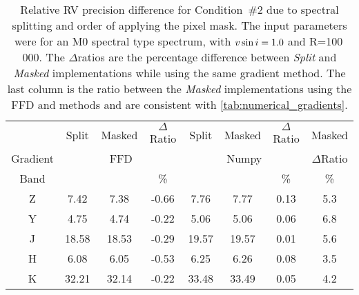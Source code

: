 
\begin{table}
    \centering
    \caption[{RV} precision with different splitting.]{Relative {RV} precision difference for Condition~\#2 due to spectral splitting and order of applying the pixel mask.
        The input parameters were for an {M0} spectral type spectrum, with $v\sin{i}=1.0$ and R=100\,000.
        The \(\Delta\)ratios are the percentage difference between \textit{Split} and \textit{Masked} implementations while using the same gradient method.
        The last column is the ratio between the \textit{Masked} implementations using the {FFD} and \npgradient{} methods and are consistent with \cref{tab:numerical_gradients}.
        }
    \begin{tabular}{c|ccc|ccc|c}
        \toprule
        & Split & Masked & \(\Delta\)Ratio & Split & Masked & \(\Delta\)Ratio & Masked \\
        Gradient & \multicolumn{3}{c|}{FFD} & \multicolumn{3}{c|}{Numpy} & \(\Delta\)Ratio\\
        Band & \mps{} & \mps{} &  \%  & \mps{} & \mps{} &   \% & \% \\
        \midrule
        Z &  7.42 &  7.38 & -0.66 &  7.76 &  7.77 & 0.13 & 5.3\\
        Y &  4.75 &  4.74 & -0.22 &  5.06 &  5.06 & 0.06 & 6.8\\
        J & 18.58 & 18.53 & -0.29 & 19.57 & 19.57 & 0.01 & 5.6\\
        H &  6.08 &  6.05 & -0.53 &  6.25 &  6.26 & 0.08 & 3.5\\
        K & 32.21 & 32.14 & -0.22 & 33.48 & 33.49 & 0.05 & 4.2\\
        \bottomrule
    \end{tabular}\label{tab:mask_ordering}
\end{table}
